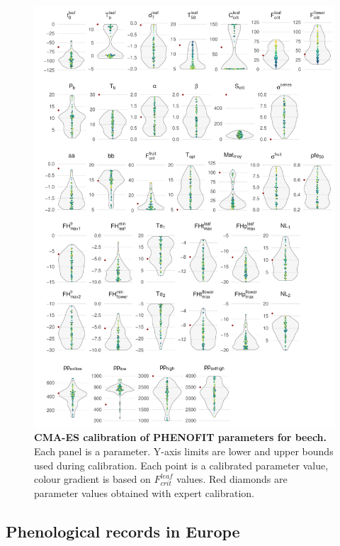 \begin{figure}[hp]
\vspace*{-0.5cm}
\centering
\includegraphics[width=1\textwidth]{chapter3/figs/parameters_fsylvatica.pdf}
\caption{\textbf{CMA-ES calibration of PHENOFIT parameters for beech.} Each panel is a parameter. Y-axis limits are lower and upper bounds used during calibration. Each point is a calibrated parameter value, colour gradient is based on $F_{crit}^{leaf}$ values. Red diamonds are parameter values obtained with expert calibration.}
\vspace*{-5cm}
\end{figure}

\newpage

\subsection{Phenological records in Europe}

